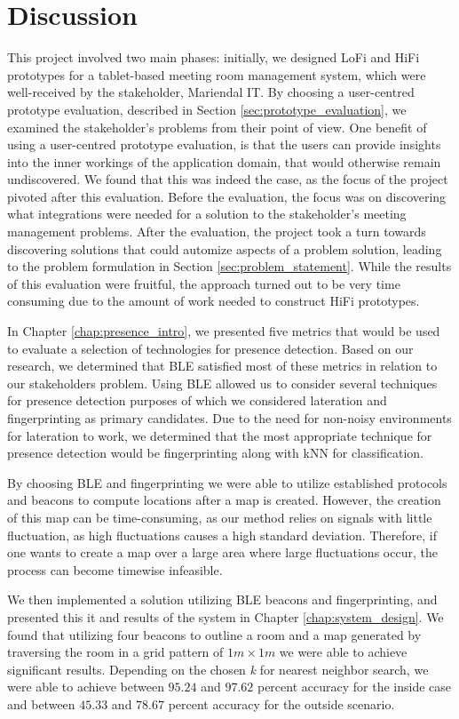 \chapter{Discussion}\label{chap:discussion}
This project involved two main phases: initially, we designed LoFi and HiFi prototypes for a tablet-based meeting room management system, which were well-received by the stakeholder, Mariendal IT.
By choosing a user-centred prototype evaluation, described in Section \ref{sec:prototype_evaluation}, we examined the stakeholder's problems from their point of view.
One benefit of using a user-centred prototype evaluation, is that the users can provide insights into the inner workings of the application domain, that would otherwise remain undiscovered.
We found that this was indeed the case, as the focus of the project pivoted after this evaluation. 
Before the evaluation, the focus was on discovering what integrations were needed for a solution to the stakeholder's meeting management problems.
After the evaluation, the project took a turn towards discovering solutions that could automize aspects of a problem solution, leading to the problem formulation in Section \ref{sec:problem_statement}.
While the results of this evaluation were fruitful, the approach turned out to be very time consuming due to the amount of work needed to construct HiFi prototypes.

In Chapter \ref{chap:presence_intro}, we presented five metrics that would be used to evaluate a selection of technologies for presence detection.
Based on our research, we determined that BLE satisfied most of these metrics in relation to our stakeholders problem.
Using BLE allowed us to consider several techniques for presence detection purposes of which we considered lateration and fingerprinting as primary candidates.
Due to the need for non-noisy environments for lateration to work, we determined that the most appropriate technique for presence detection would be fingerprinting along with kNN for classification.

By choosing BLE and fingerprinting we were able to utilize established protocols and beacons to compute locations after a map is created. 
However, the creation of this map can be time-consuming, as our method relies on signals with little fluctuation, as high fluctuations causes a high standard deviation. 
Therefore, if one wants to create a map over a large area where large fluctuations occur, the process can become timewise infeasible.

We then implemented a solution utilizing BLE beacons and fingerprinting, and presented this it and results of the system in Chapter \ref{chap:system_design}.
We found that utilizing four beacons to outline a room and a map generated by traversing the room in a grid pattern of $1m \times 1m$ we were able to achieve significant results.
Depending on the chosen \textit{k} for nearest neighbor search, we were able to achieve between $95.24$ and $97.62$ percent accuracy for the inside case and between $45.33$ and $78.67$ percent accuracy for the outside scenario. 

